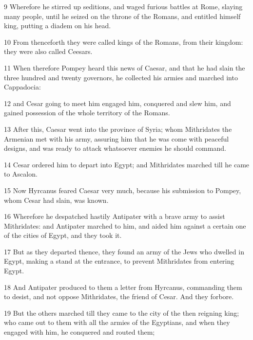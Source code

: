 \par 9 Wherefore he stirred up seditions, and waged furious battles at Rome, slaying many people, until he seized on the throne of the Romans, and entitled himself king, putting a diadem on his head. 

\par 10 From thenceforth they were called kings of the Romans, from their kingdom: they were also called Ceesars.

\par 11 When therefore Pompey heard this news of Caesar, and that he had slain the three hundred and twenty governors, he collected his armies and marched into Cappadocia: 

\par 12 and Cesar going to meet him engaged him, conquered and slew him, and gained possession of the whole territory of the Romans. 

\par 13 After this, Caesar went into the province of Syria; whom Mithridates the Armenian met with his army, assuring him that he was come with peaceful designs, and was ready to attack whatsoever enemies he should command. 

\par 14 Cesar ordered him to depart into Egypt; and Mithridates marched till he came to Ascalon. 

\par 15 Now Hyrcanus feared Caesar very much, because his submission to Pompey, whom Cesar had slain, was known. 

\par 16 Wherefore he despatched hastily Antipater with a brave army to assist Mithridates: and Antipater marched to him, and aided him against a certain one of the cities of Egypt, and they took it. 

\par 17 But as they departed thence, they found an army of the Jews who dwelled in Egypt, making a stand at the entrance, to prevent Mithridates from entering Egypt. 

\par 18 And Antipater produced to them a letter from Hyrcanus, commanding them to desist, and not oppose Mithridates, the friend of Cesar. And they forbore. 

\par 19 But the others marched till they came to the city of the then reigning king; who came out to them with all the armies of the Egyptians, and when they engaged with him, he conquered and routed them; 

